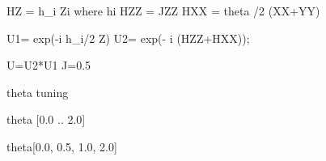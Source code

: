 

HZ = h_i Zi      where hi \in [0,2pi]
HZZ = JZZ
HXX = theta /2 (XX+YY)

U1= exp(-i h_i/2 Z)
U2= exp(- i (HZZ+HXX));

U=U2*U1
J=0.5

theta tuning 

theta [0.0 .. 2.0]



theta[0.0, 0.5, 1.0, 2.0]